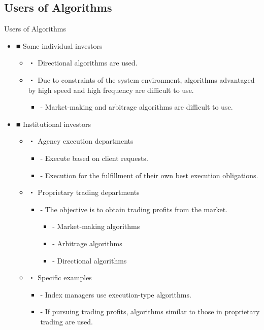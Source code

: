 \documentclass[dvipdfmx, autodetect-engine, aspectratio=169, 10.5pt]{beamer}
\begin{document}
\subsection{Users of Algorithms}
\begin{frame}{Users of Algorithms}
	\scriptsize
	\begin{itemize}
		\item ■ Some individual investors
		      \begin{itemize}
			      \item ・ Directional algorithms are used.
			      \item ・ Due to constraints of the system environment, algorithms advantaged by high speed and high frequency are difficult to use.
			            \begin{itemize}
				            \item - Market-making and arbitrage algorithms are difficult to use.
			            \end{itemize}
		      \end{itemize}
		\item ■ Institutional investors
		      \begin{itemize}
			      \item ・ Agency execution departments
			            \begin{itemize}
				            \item - Execute based on client requests.
				            \item - Execution for the fulfillment of their own best execution obligations.
			            \end{itemize}
			      \item ・ Proprietary trading departments
			            \begin{itemize}
				            \item - The objective is to obtain trading profits from the market.
				                  \begin{itemize}
					                  \item - Market-making algorithms
					                  \item - Arbitrage algorithms
					                  \item - Directional algorithms
				                  \end{itemize}
			            \end{itemize}
			      \item ・ Specific examples
			            \begin{itemize}
				            \item - Index managers use execution-type algorithms.
				            \item - If pursuing trading profits, algorithms similar to those in proprietary trading are used.
			            \end{itemize}
		      \end{itemize}
	\end{itemize}
\end{frame}
\end{document}

